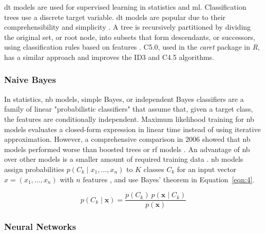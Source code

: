 \let\LaTeXcline\cline\documentclass[sn-mathphys-num]{sn-jnl}\let\cline\LaTeXcline
\begin{document}
\acrfull{dt} models are used for supervised learning in statistics and \acrlong{ml}. Classification trees use a discrete target variable. \acrshort{dt} models are popular due to their comprehensibility and simplicity \cite{Wu2008}. A tree is recursively partitioned by dividing the original set, or root node, into subsets that form descendants, or successors, using classification rules based on features \cite{ShalevShwartz2014}. C5.0, used in the \textit{caret} package in \textit{R}, has a similar approach and improves the ID3 and C4.5 algorithms.

\subsubsection{Naive Bayes}

In statistics, \acrfull{nb} models, simple Bayes, or independent Bayes \cite{Hand2001} classifiers are a family of linear "probabilistic classifiers" that assume that, given a target class, the features are conditionally independent. Maximum likelihood training for \acrshort{nb} models evaluates a closed-form expression \cite{Russell1999} in linear time instead of using iterative approximation. However, a comprehensive comparison in 2006 showed that \acrshort{nb} models performed worse than boosted trees or \acrfull{rf} models \cite{Caruana2006}. An advantage of \acrshort{nb} over other models is a smaller amount of required training data \cite{John2013}. \acrshort{nb} models assign probabilities $p(C_{k}\mid x_{1},\ldots, x_{n})$ to $K$ classes $C_{k}$ for an input vector $x = (x_{1},\ldots, x_{n})$ with $n$ features \cite{Murty2011}, and use Bayes' theorem in Equation~\ref{eqn:4}.

\begin{equation}
	p(C_{k}\mid \mathbf{x})={\frac{p(C_{k})\ p(\mathbf{x} \mid C_{k})}{p(\mathbf{x})}}
	\label{eqn:4}
\end{equation}

\subsubsection{Neural Networks}
\end{document}
